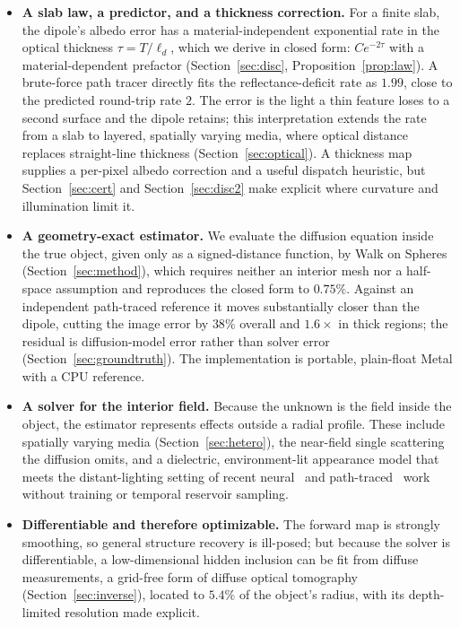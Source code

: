 \documentclass[11pt]{article}
\providecommand{\RMaxRelErr}{0.00}
\providecommand{\RReflRateBrute}{0.00}
\providecommand{\RInvCentreErr}{0.0}
\providecommand{\RGtReduce}{0}
\providecommand{\RGtThickX}{0}
\renewcommand{\RMaxRelErr}{0.75}
\renewcommand{\RReflRateBrute}{1.99}
\renewcommand{\RInvCentreErr}{5.4}
\renewcommand{\RGtReduce}{38}
\renewcommand{\RGtThickX}{1.6}
\newcommand{\ld}{\ell_d}
\begin{document}
\begin{itemize}
\item \textbf{A slab law, a predictor, and a thickness correction.} For a finite
slab, the dipole's albedo error has a material-independent exponential rate in
the optical thickness $\tau=T/\ld$, which we derive in closed form:
$C e^{-2\tau}$ with a material-dependent prefactor (Section~\ref{sec:disc},
Proposition~\ref{prop:law}). A brute-force path tracer directly fits the
reflectance-deficit rate as $\RReflRateBrute$, close to the predicted round-trip
rate $2$. The error is the light a thin feature loses to a second surface and the
dipole retains; this interpretation extends the rate from a slab to layered,
spatially varying media, where optical distance replaces straight-line thickness
(Section~\ref{sec:optical}). A thickness map supplies a per-pixel albedo
correction and a useful dispatch heuristic, but Section~\ref{sec:cert} and
Section~\ref{sec:disc2} make explicit where curvature and illumination limit it.
\item \textbf{A geometry-exact estimator.} We evaluate the diffusion equation
inside the true object, given only as a signed-distance function, by Walk on
Spheres (Section~\ref{sec:method}), which requires neither an interior mesh nor a half-space assumption and reproduces
the closed form to $\RMaxRelErr\%$. Against an independent path-traced
reference it moves substantially closer than the dipole, cutting the image error by
$\RGtReduce\%$ overall and $\RGtThickX\times$ in thick regions; the residual is
diffusion-model error rather than solver error (Section~\ref{sec:groundtruth}). The
implementation is portable, plain-float Metal with a CPU reference.
\item \textbf{A solver for the interior field.} Because the unknown is the field
inside the object, the estimator represents effects outside a radial profile. These include
spatially varying media (Section~\ref{sec:hetero}), the near-field
single scattering the diffusion omits, and a dielectric, environment-lit
appearance model that meets the distant-lighting setting of recent
neural~\cite{neupress2024} and path-traced~\cite{werner2024} work without
training or temporal reservoir sampling.
\item \textbf{Differentiable and therefore optimizable.} The forward map is strongly
smoothing, so general structure recovery is ill-posed; but because the solver is
differentiable, a low-dimensional hidden inclusion can be fit from diffuse
measurements, a grid-free form of diffuse optical tomography
(Section~\ref{sec:inverse}), located to $\RInvCentreErr\%$ of the object's radius,
with its depth-limited resolution made explicit.
\end{itemize}
\end{document}
